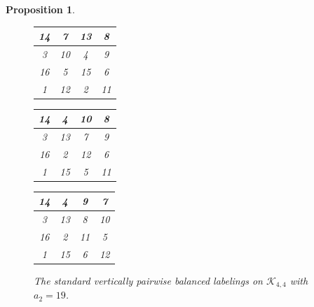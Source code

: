 \documentclass[10pt, reqno]{amsart}
\theoremstyle{definition}
\theoremstyle{plain}
\newtheorem{proposition}[definition]{Proposition}
\begin{document}
\begin{proposition}
\begin{figure}[hbt!]
    \centering
    \begin{tabular}{|c|c|c|c|} \hline
       14  &7  &13  &8  \\  \hline
        3  &10   &4   &9  \\  \hline
       16  &5   &15  &6  \\  \hline
        1  &12  &2   &11  \\  \hline
    \end{tabular}
\hspace{0.15in}\begin{tabular}{|c|c|c|c|} \hline
       14  &4  &10  &8  \\  \hline
        3  &13   &7   &9  \\  \hline
       16  &2   &12  &6  \\  \hline
        1  &15  &5   &11  \\  \hline
    \end{tabular}
\hspace{0.15in}\begin{tabular}{|c|c|c|c|} \hline
       14  &4  &9  &7  \\  \hline
        3  &13   &8   &10  \\  \hline
       16  &2   &11  &5  \\  \hline
        1  &15  &6   &12  \\  \hline
    \end{tabular}
    \caption{The standard vertically pairwise balanced labelings on
    $\mathcal{K}_{4,4}$ with $a_2=19$.}
    \label{fig:StandVertLabelsA2=19}
\end{figure}


\end{proposition}
\end{document}

